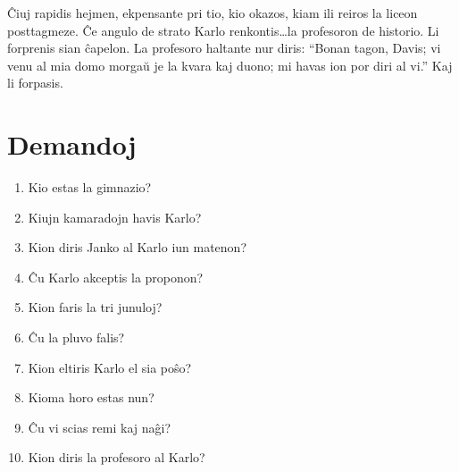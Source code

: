 Ĉiuj rapidis hejmen, ekpensante pri tio, kio okazos, kiam ili reiros la liceon posttagmeze. Ĉe angulo de strato Karlo renkontis\ldots{}la profesoron de historio. Li forprenis sian ĉapelon. La profesoro haltante nur diris: ``Bonan tagon, Davis; vi venu al mia domo morgaŭ je la kvara kaj duono; mi havas ion por diri al vi.'' Kaj li forpasis.

\newpage

\section*{Demandoj}

\begin{enumerate}
    \item  Kio estas la gimnazio?
    \item  Kiujn kamaradojn havis Karlo?
    \item  Kion diris Janko al Karlo iun matenon?
    \item  Ĉu Karlo akceptis la proponon?
    \item  Kion faris la tri junuloj?
    \item  Ĉu la pluvo falis?
    \item  Kion eltiris Karlo el sia poŝo?
    \item  Kioma horo estas nun?
    \item  Ĉu vi scias remi kaj naĝi?
    \item  Kion diris la profesoro al Karlo?
\end{enumerate}
